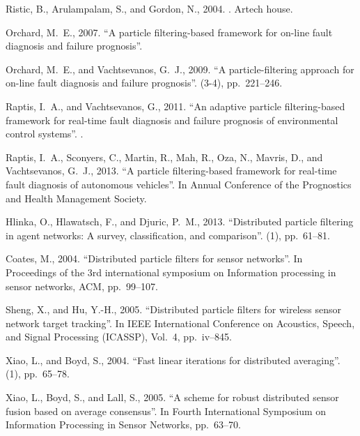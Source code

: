 \documentclass[10pt,twocolumn,twoside]{IEEEtran}
\begin{document}
\begin{thebibliography}{10}
Ristic, B., Arulampalam, S., and Gordon, N., 2004.
.
\newblock Artech house.

Orchard, M.~E., 2007.
\newblock ``A particle filtering-based framework for on-line fault diagnosis
  and failure prognosis''.

Orchard, M.~E., and Vachtsevanos, G.~J., 2009.
\newblock ``A particle-filtering approach for on-line fault diagnosis and
  failure prognosis''.
(3-4), pp.~221--246.

Raptis, I.~A., and Vachtsevanos, G., 2011.
\newblock ``An adaptive particle filtering-based framework for real-time fault
  diagnosis and failure prognosis of environmental control systems''.
.

Raptis, I.~A., Sconyers, C., Martin, R., Mah, R., Oza, N., Mavris, D., and
  Vachtsevanos, G.~J., 2013.
\newblock ``A particle filtering-based framework for real-time fault diagnosis
  of autonomous vehicles''.
\newblock In Annual Conference of the Prognostics and Health Management
  Society.

Hlinka, O., Hlawatsch, F., and Djuric, P.~M., 2013.
\newblock ``Distributed particle filtering in agent networks: A survey,
  classification, and comparison''.
(1), pp.~61--81.

Coates, M., 2004.
\newblock ``Distributed particle filters for sensor networks''.
\newblock In Proceedings of the 3rd international symposium on Information
  processing in sensor networks, ACM, pp.~99--107.

Sheng, X., and Hu, Y.-H., 2005.
\newblock ``Distributed particle filters for wireless sensor network target
  tracking''.
\newblock In IEEE International Conference on Acoustics, Speech, and Signal
  Processing (ICASSP), Vol.~4, pp.~iv--845.

Xiao, L., and Boyd, S., 2004.
\newblock ``Fast linear iterations for distributed averaging''.
(1), pp.~65--78.

Xiao, L., Boyd, S., and Lall, S., 2005.
\newblock ``A scheme for robust distributed sensor fusion based on average
  consensus''.
\newblock In Fourth International Symposium on Information Processing in Sensor
  Networks, pp.~63--70.

\end{thebibliography}
\end{document}
